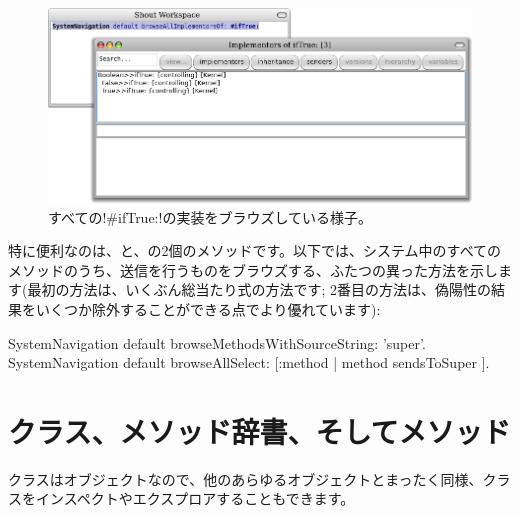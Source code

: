 \documentclass[a4paper,10pt,twoside]{book}
\begin{document}
\begin{figure}[ht]\centering
	\includegraphics[width=\linewidth]{implementors}
	\caption{すべての\ct!\#ifTrue:!の実装をブラウズしている様子。}
\end{figure}

特に便利なのは、と、の2個のメソッドです。以下では、システム中のすべてのメソッドのうち、\super{}送信を行うものをブラウズする、ふたつの異った方法を示します(最初の方法は、いくぶん総当たり式の方法です; 2番目の方法は、偽陽性の結果をいくつか除外することができる点でより優れています): %
\begin{code}{}
SystemNavigation default browseMethodsWithSourceString: 'super'.
SystemNavigation default browseAllSelect: [:method | method sendsToSuper ].
\end{code}

\section{クラス、メソッド辞書、そしてメソッド}

クラスはオブジェクトなので、他のあらゆるオブジェクトとまったく同様、クラスをインスペクトやエクスプロアすることもできます。
\end{document}
